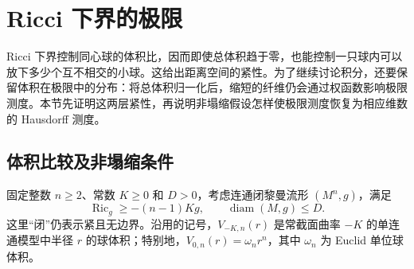 
% 
% 

\section{Ricci 下界的极限}
\label{g3:sec:2903}

Ricci 下界控制同心球的体积比，因而即使总体积趋于零，也能控制一只球内可以放下多少个互不相交的小球。这给出距离空间的紧性。为了继续讨论积分，还要保留体积在极限中的分布：将总体积归一化后，缩短的纤维仍会通过权函数影响极限测度。本节先证明这两层紧性，再说明非塌缩假设怎样使极限测度恢复为相应维数的 Hausdorff 测度。

\subsection{体积比较及非塌缩条件}
\label{g3:subsec:2903:01}
固定整数 \(n\ge2\)、常数 \(K\ge0\) 和 \(D>0\)，考虑连通闭黎曼流形 \((M^n,g)\)，满足
\begin{equation}\label{g3:eq:ricci-limit-class}
	\operatorname{Ric}_g\ge-(n-1)Kg,
	\qquad \operatorname{diam}(M,g)\le D.
\end{equation}
这里“闭”仍表示紧且无边界。沿用的记号，\(V_{-K,n}(r)\) 是常截面曲率 \(-K\) 的单连通模型中半径 \(r\) 的球体积；特别地，\(V_{0,n}(r)=\omega_nr^n\)，其中 \(\omega_n\) 为 Euclid 单位球体积。

